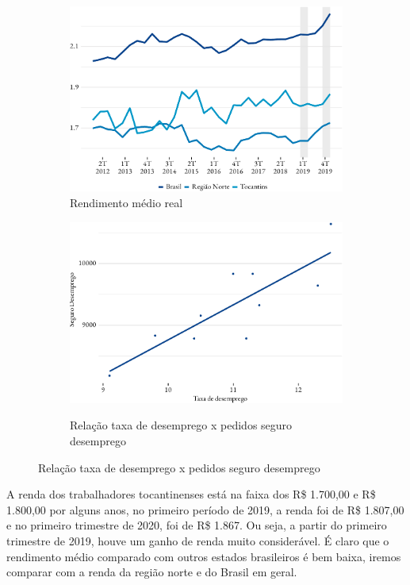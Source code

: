 \begin{figure}[!h]
	\begin{subfigure}{\linewidth}
		\caption{Rendimento médio real}
		\includegraphics{fig/rend_medio-1.pdf}
		\notes{\trimestres}
	\end{subfigure}
	\begin{subfigure}{\linewidth}
		\caption{Relação taxa de desemprego x pedidos seguro desemprego}
		\includegraphics[width=\linewidth]{fig/reg_emprego-2.pdf}
		\label{fig:regressao}
	\end{subfigure}
\end{figure}


\par A renda dos trabalhadores tocantinenses está na faixa dos R\$ 1.700,00 e R\$ 1.800,00 por alguns anos, no primeiro período de 2019, a renda foi de R\$ 1.807,00 e no primeiro trimestre de 2020, foi de R\$ 1.867. Ou seja, a partir do primeiro trimestre de 2019, houve um ganho de renda muito considerável. É claro que o rendimento médio comparado com outros estados brasileiros é bem baixa, iremos comparar com a renda da região norte e do Brasil em geral.



